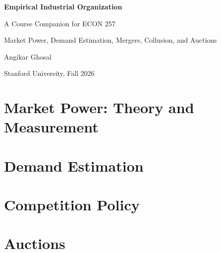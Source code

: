 \documentclass[11pt,oneside]{book}
\begin{document}
\frontmatter
\hypersetup{pageanchor=false}
\begin{titlepage}
\centering
\vspace*{2in}
{\Huge\bfseries Empirical Industrial Organization\par}
\vspace{0.4in}
{\LARGE A Course Companion for ECON 257\par}
\vspace{0.3in}
{\large Market Power, Demand Estimation, Mergers, Collusion, and Auctions\par}
\vfill
{\large Angikar Ghosal\par}
\vspace{0.2in}
{\large Stanford University, Fall 2026\par}
\vspace*{0.5in}
\end{titlepage}
\hypersetup{pageanchor=true}

\tableofcontents

\mainmatter
\part{Market Power: Theory and Measurement}





\part{Demand Estimation}







\part{Competition Policy}




\part{Auctions}



\appendix
{}
\cleardoublepage




\backmatter
\cleardoublepage
{}
{}


\end{document}
